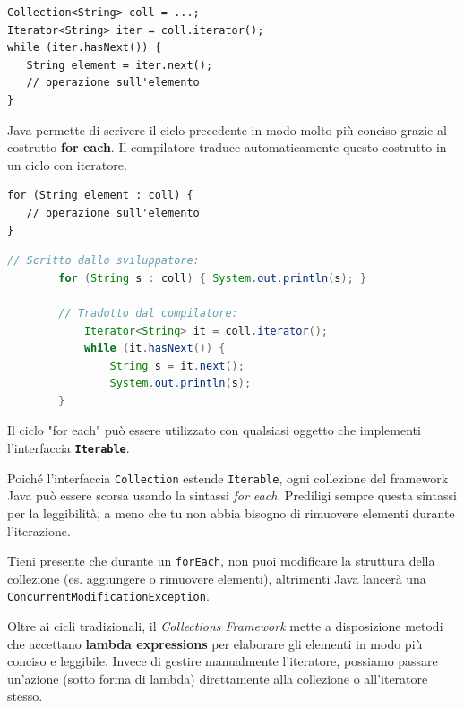 \begin{lstlisting}[caption={Utilizzo classico del ciclo while con Iterator}]
Collection<String> coll = ...;
Iterator<String> iter = coll.iterator();
while (iter.hasNext()) {
   String element = iter.next();
   // operazione sull'elemento
}
\end{lstlisting}

Java permette di scrivere il ciclo precedente in modo molto più conciso grazie al costrutto \textbf{for each}. Il compilatore traduce automaticamente questo costrutto in un ciclo con iteratore.

\begin{lstlisting}[caption={Sintassi for each}]
for (String element : coll) {
   // operazione sull'elemento
}
\end{lstlisting}

\begin{dettagli}
    \begin{lstlisting}[language=Java]
        // Scritto dallo sviluppatore:
        for (String s : coll) { System.out.println(s); }

        // Tradotto dal compilatore:
            Iterator<String> it = coll.iterator();
            while (it.hasNext()) {
                String s = it.next();
                System.out.println(s);
        }
    \end{lstlisting}
\end{dettagli}

Il ciclo "for each" può essere utilizzato con qualsiasi oggetto che implementi l'interfaccia \textbf{\texttt{Iterable}}. 

\begin{bestpractice}[]
Poiché l'interfaccia \texttt{Collection} estende \texttt{Iterable}, ogni collezione del framework Java può essere scorsa usando la sintassi \textit{for each}. Prediligi sempre questa sintassi per la leggibilità, a meno che tu non abbia bisogno di rimuovere elementi durante l'iterazione.
\end{bestpractice}

\begin{warningbox}
Tieni presente che durante un \texttt{forEach}, non puoi modificare la struttura della collezione (es. aggiungere o rimuovere elementi), altrimenti Java lancerà una \texttt{ConcurrentModificationException}.
\end{warningbox}

Oltre ai cicli tradizionali, il \textit{Collections Framework} mette a disposizione metodi che accettano \textbf{lambda expressions} per elaborare gli elementi in modo più conciso e leggibile. Invece di gestire manualmente l'iteratore, possiamo passare un'azione (sotto forma di lambda) direttamente alla collezione o all'iteratore stesso.


